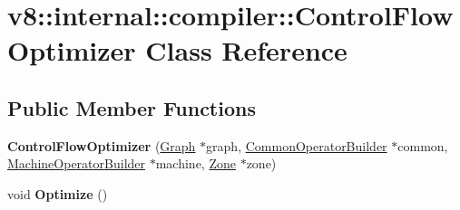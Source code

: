 \hypertarget{classv8_1_1internal_1_1compiler_1_1_control_flow_optimizer}{}\section{v8\+:\+:internal\+:\+:compiler\+:\+:Control\+Flow\+Optimizer Class Reference}
\label{classv8_1_1internal_1_1compiler_1_1_control_flow_optimizer}
\subsection*{Public Member Functions}
\begin{DoxyCompactItemize}
\item 
{\bfseries Control\+Flow\+Optimizer} (\hyperlink{classv8_1_1internal_1_1compiler_1_1_graph}{Graph} $\ast$graph, \hyperlink{classv8_1_1internal_1_1compiler_1_1_common_operator_builder}{Common\+Operator\+Builder} $\ast$common, \hyperlink{classv8_1_1internal_1_1compiler_1_1_machine_operator_builder}{Machine\+Operator\+Builder} $\ast$machine, \hyperlink{classv8_1_1internal_1_1_zone}{Zone} $\ast$zone)\hypertarget{classv8_1_1internal_1_1compiler_1_1_control_flow_optimizer_ae4209d872f5980178890a25123cffba9}{}\label{classv8_1_1internal_1_1compiler_1_1_control_flow_optimizer_ae4209d872f5980178890a25123cffba9}

\item 
void {\bfseries Optimize} ()\hypertarget{classv8_1_1internal_1_1compiler_1_1_control_flow_optimizer_ac7d2f4952d504013f9748cdf7ae24abc}{}\label{classv8_1_1internal_1_1compiler_1_1_control_flow_optimizer_ac7d2f4952d504013f9748cdf7ae24abc}

\end{DoxyCompactItemize}
